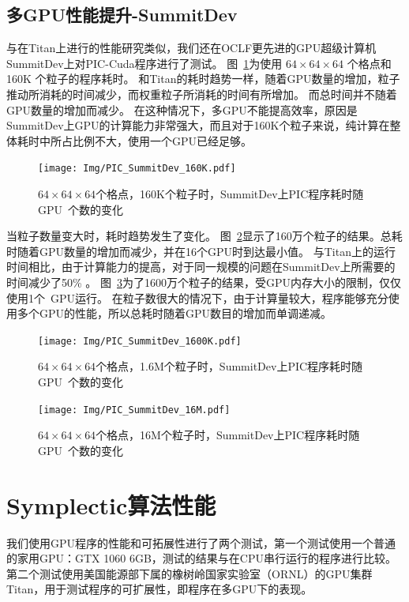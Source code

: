 \subsection{多GPU性能提升-SummitDev}
与在Titan上进行的性能研究类似，我们还在OCLF更先进的GPU超级计算机SummitDev上对PIC-Cuda程序进行了测试。
图~\ref{fig:PIC_SummitDev_160K}为使用 $64\times64\times64$ 个格点和  160K 个粒子的程序耗时。
和Titan的耗时趋势一样，随着GPU数量的增加，粒子推动所消耗的时间减少，而权重粒子所消耗的时间有所增加。
而总时间并不随着GPU数量的增加而减少。
在这种情况下，多GPU不能提高效率，原因是SummitDev上GPU的计算能力非常强大，而且对于160K个粒子来说，纯计算在整体耗时中所占比例不大，使用一个GPU已经足够。

\begin{figure}[!htb]
  \centering
  \texttt{[image: Img/PIC\_SummitDev\_160K.pdf]}
  \caption{$64 \times 64 \times 64$个格点，160K个粒子时，SummitDev上PIC程序耗时随GPU~个数的变化}
  \label{fig:PIC_SummitDev_160K}
\end{figure}

当粒子数量变大时，耗时趋势发生了变化。
图~\ref{fig:PIC_SummitDev_1600K}显示了160万个粒子的结果。总耗时随着GPU数量的增加而减少，并在16个GPU时到达最小值。
与Titan上的运行时间相比，由于计算能力的提高，对于同一规模的问题在SummitDev上所需要的时间减少了50\% 。
图~\ref{fig:PIC_SummitDev_16M}为了1600万个粒子的结果，受GPU内存大小的限制，仅仅使用1个~GPU运行。
在粒子数很大的情况下，由于计算量较大，程序能够充分使用多个GPU的性能，所以总耗时随着GPU数目的增加而单调递减。

\begin{figure}[!htb]
  \centering
  \texttt{[image: Img/PIC\_SummitDev\_1600K.pdf]}
  \caption{$64 \times 64 \times 64$个格点，1.6M个粒子时，SummitDev上PIC程序耗时随GPU~个数的变化}
  \label{fig:PIC_SummitDev_1600K}
\end{figure}

\begin{figure}[!htb]
  \centering
  \texttt{[image: Img/PIC\_SummitDev\_16M.pdf]}
  \caption{$64 \times 64 \times 64$个格点，16M个粒子时，SummitDev上PIC程序耗时随GPU~个数的变化}
  \label{fig:PIC_SummitDev_16M}
\end{figure}

\section{Symplectic算法性能}      \label{section:Symplectic_performance}
我们使用GPU程序的性能和可拓展性进行了两个测试，第一个测试使用一个普通的家用GPU：GTX 1060 6GB，测试的结果与在CPU串行运行的程序进行比较。第二个测试使用美国能源部下属的橡树岭国家实验室（ORNL）的GPU集群Titan，用于测试程序的可扩展性，即程序在多GPU下的表现。

